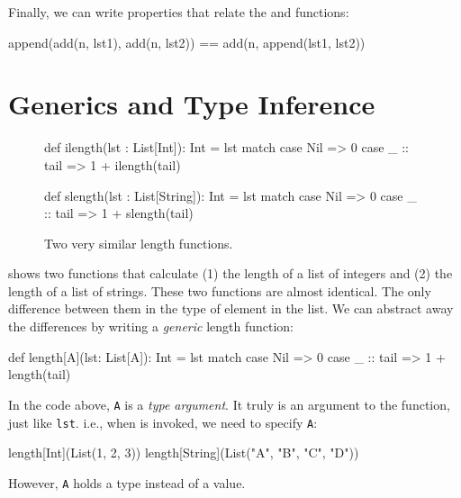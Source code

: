 \documentclass{book}
\begin{document}
Finally, we can write properties that relate the  and
 functions:
%
\begin{scalacode}
append(add(n, lst1), add(n, lst2)) == add(n, append(lst1, lst2))
\end{scalacode}


\newlecture

\section{Generics and Type Inference}

\begin{figure}
\begin{minipage}{0.45\textwidth}
\begin{scalacode}
def ilength(lst : List[Int]): Int = lst match {
  case Nil => 0
  case _ :: tail => 1 + ilength(tail)
}
\end{scalacode}
\end{minipage}
\quad\vrule\quad
\begin{minipage}{0.45\textwidth}
\begin{scalacode}
def slength(lst : List[String]): Int = lst match {
  case Nil => 0
  case _ :: tail => 1 + slength(tail)
}
\end{scalacode}
\end{minipage}
\caption{Two very similar length functions.}
\label{monolength}
\end{figure}

 shows two functions that calculate (1) the length of a list
of integers and (2) the length of a list of strings. These two functions
are almost identical. The only difference between them in the type of
element in the list. We can abstract away the differences by writing
a \emph{generic} length function:
%
\begin{scalacode}
def length[A](lst: List[A]): Int = lst match {
  case Nil => 0
  case _ :: tail => 1 + length(tail)
}
\end{scalacode}

In the code above, \verb|A| is a \emph{type argument}. It truly is an argument
to the function, just like \verb|lst|. i.e., when  is
invoked, we need to specify \verb|A|:
%
\begin{scalacode}
length[Int](List(1, 2, 3))
length[String](List("A", "B", "C", "D"))
\end{scalacode}
%
However, \verb|A| holds a type instead of a value.
\end{document}

